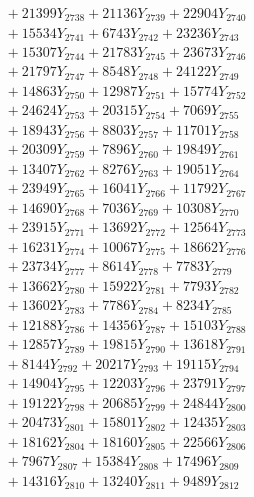 \documentclass[a4paper,10pt]{article}
\begin{document}
{\begin{align}
&\;  + 21399 Y_{2738} + 21136 Y_{2739} + 22904 Y_{2740} \\[0.3ex]
&\;  + 15534 Y_{2741} + 6743 Y_{2742} + 23236 Y_{2743} \\[0.3ex]
&\;  + 15307 Y_{2744} + 21783 Y_{2745} + 23673 Y_{2746} \\[0.3ex]
&\;  + 21797 Y_{2747} + 8548 Y_{2748} + 24122 Y_{2749} \\[0.3ex]
&\;  + 14863 Y_{2750} + 12987 Y_{2751} + 15774 Y_{2752} \\[0.3ex]
&\;  + 24624 Y_{2753} + 20315 Y_{2754} + 7069 Y_{2755} \\[0.3ex]
&\;  + 18943 Y_{2756} + 8803 Y_{2757} + 11701 Y_{2758} \\[0.5ex]\allowbreak
&\;  + 20309 Y_{2759} + 7896 Y_{2760} + 19849 Y_{2761} \\[0.3ex]
&\;  + 13407 Y_{2762} + 8276 Y_{2763} + 19051 Y_{2764} \\[0.3ex]
&\;  + 23949 Y_{2765} + 16041 Y_{2766} + 11792 Y_{2767} \\[0.3ex]
&\;  + 14690 Y_{2768} + 7036 Y_{2769} + 10308 Y_{2770} \\[0.3ex]
&\;  + 23915 Y_{2771} + 13692 Y_{2772} + 12564 Y_{2773} \\[0.3ex]
&\;  + 16231 Y_{2774} + 10067 Y_{2775} + 18662 Y_{2776} \\[0.3ex]
&\;  + 23734 Y_{2777} + 8614 Y_{2778} + 7783 Y_{2779} \\[0.3ex]
&\;  + 13662 Y_{2780} + 15922 Y_{2781} + 7793 Y_{2782} \\[0.3ex]
&\;  + 13602 Y_{2783} + 7786 Y_{2784} + 8234 Y_{2785} \\[0.3ex]
&\;  + 12188 Y_{2786} + 14356 Y_{2787} + 15103 Y_{2788} \\[0.5ex]\allowbreak
&\;  + 12857 Y_{2789} + 19815 Y_{2790} + 13618 Y_{2791} \\[0.3ex]
&\;  + 8144 Y_{2792} + 20217 Y_{2793} + 19115 Y_{2794} \\[0.3ex]
&\;  + 14904 Y_{2795} + 12203 Y_{2796} + 23791 Y_{2797} \\[0.3ex]
&\;  + 19122 Y_{2798} + 20685 Y_{2799} + 24844 Y_{2800} \\[0.3ex]
&\;  + 20473 Y_{2801} + 15801 Y_{2802} + 12435 Y_{2803} \\[0.3ex]
&\;  + 18162 Y_{2804} + 18160 Y_{2805} + 22566 Y_{2806} \\[0.3ex]
&\;  + 7967 Y_{2807} + 15384 Y_{2808} + 17496 Y_{2809} \\[0.3ex]
&\;  + 14316 Y_{2810} + 13240 Y_{2811} + 9489 Y_{2812} \\[0.3ex]

\end{align}}
\end{document}
